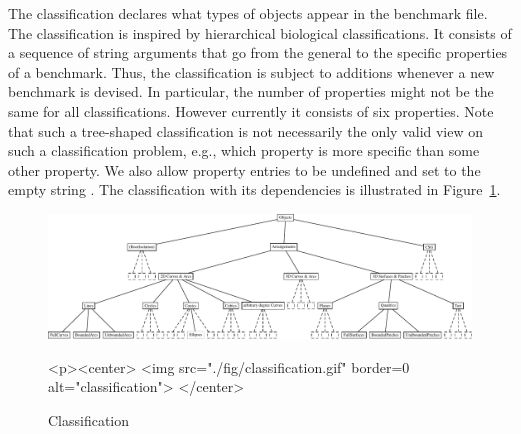 The classification declares what types of objects appear in the
benchmark file. The classification is inspired by hierarchical
biological classifications. It consists of a sequence of string
arguments that go from the general to the specific properties of a
benchmark. Thus, the classification is subject to additions whenever a
new benchmark is devised. In particular, the number of properties
might not be the same for all classifications. However currently it
consists of six properties.  Note that such a tree-shaped
classification is not necessarily the only valid view on such a
classification problem, e.g., which property is more specific than
some other property. We also allow property entries to be undefined
and set to the empty string .
The classification with its dependencies is illustrated in
Figure~\ref{bench_fig::class}.

\begin{figure}[t]
\begin{ccTexOnly}
  \begin{center}
  \includegraphics[width=\textwidth]{Benchmark/fig/classification}
  \end{center}
\end{ccTexOnly}
\begin{ccHtmlOnly}
  <p><center>
  <img src="./fig/classification.gif" border=0 alt="classification">
  </center>
\end{ccHtmlOnly}
\caption{Classification\label{bench_fig::class}}
\end{figure}

